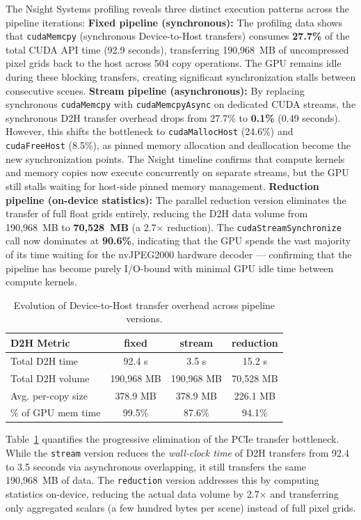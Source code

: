 \documentclass[10pt,conference,compsoc]{IEEEtran}
\begin{document}
The Nsight Systems profiling reveals three distinct execution patterns across
the pipeline iterations:
\textbf{Fixed pipeline (synchronous):} The profiling data shows that
\texttt{cudaMemcpy} (synchronous Device-to-Host transfers) consumes
\textbf{27.7\%} of the total CUDA API time (92.9 seconds), transferring
190,968~MB of uncompressed pixel grids back to the host across 504 copy
operations. The GPU remains idle during these blocking transfers, creating
significant synchronization stalls between consecutive scenes.
\textbf{Stream pipeline (asynchronous):} By replacing synchronous
\texttt{cudaMemcpy} with \texttt{cudaMemcpyAsync} on dedicated CUDA streams,
the synchronous D2H transfer overhead drops from 27.7\% to \textbf{0.1\%}
(0.49 seconds). However, this shifts the bottleneck to
\texttt{cudaMallocHost} (24.6\%) and \texttt{cudaFreeHost} (8.5\%), as
pinned memory allocation and deallocation become the new synchronization
points. The Nsight timeline confirms that compute kernels and memory copies
now execute concurrently on separate streams, but the GPU still stalls
waiting for host-side pinned memory management.
\textbf{Reduction pipeline (on-device statistics):} The parallel reduction
version eliminates the transfer of full float grids entirely, reducing the
D2H data volume from 190,968~MB to \textbf{70,528~MB} (a 2.7$\times$
reduction). The \texttt{cudaStreamSynchronize} call now dominates at
\textbf{90.6\%}, indicating that the GPU spends the vast majority of its
time waiting for the nvJPEG2000 hardware decoder --- confirming that the
pipeline has become purely I/O-bound with minimal GPU idle time between
compute kernels.

\begin{table}[h]
\centering
\begin{tabular}{lccc}
\hline
\textbf{D2H Metric} & \textbf{fixed} & \textbf{stream} & \textbf{reduction} \\ \hline
Total D2H time & 92.4 s & 3.5 s & 15.2 s \\
Total D2H volume & 190,968 MB & 190,968 MB & 70,528 MB \\
Avg. per-copy size & 378.9 MB & 378.9 MB & 226.1 MB \\
\% of GPU mem time & 99.5\% & 87.6\% & 94.1\% \\ \hline
\end{tabular}
\caption{Evolution of Device-to-Host transfer overhead across pipeline versions.}
\label{tab:d2h_evolution}
\end{table}
Table~\ref{tab:d2h_evolution} quantifies the progressive elimination of the
PCIe transfer bottleneck. While the \texttt{stream} version reduces the
\emph{wall-clock time} of D2H transfers from 92.4 to 3.5 seconds via
asynchronous overlapping, it still transfers the same 190,968~MB of data.
The \texttt{reduction} version addresses this by computing statistics
on-device, reducing the actual data volume by 2.7$\times$ and transferring
only aggregated scalars (a few hundred bytes per scene) instead of full
pixel grids.
\end{document}
